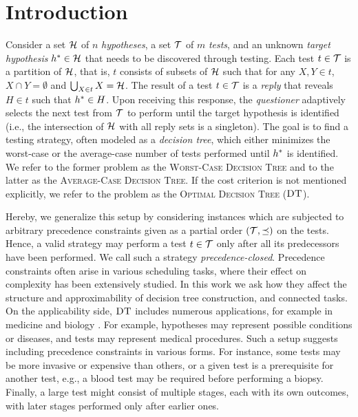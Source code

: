 \section{Introduction}

Consider a set $\mathcal{H}$ of $n$ \emph{hypotheses}, a set $\mathcal{T}$ of $m$ \emph{tests}, and an unknown \emph{target hypothesis} $h^*\in\mathcal{H}$ that needs to be discovered through testing.
Each test $t\in\mathcal{T}$ is a partition of $\mathcal{H}$, that is, $t$ consists of subsets of $\mathcal{H}$ such that for any $X,Y\in t$,  $X\cap Y=\emptyset$ and $\bigcup_{X\in t} X=\mathcal{H}$.
The result of a test $t\in\mathcal{T}$ is a \emph{reply} that reveals $H\in t$ such that $h^*\in H$. Upon receiving this response, the \emph{questioner} adaptively selects the next test from $\mathcal{T}$ to perform until the target hypothesis is identified (i.e., the intersection of $\mathcal{H}$ with all reply sets is a singleton). The goal is to find a testing strategy, often modeled as a \emph{decision tree}, which either minimizes the worst-case or the average-case number of tests performed until $h^*$ is identified. We refer to the former problem as the \textup{\textsc{Worst-Case Decision Tree}} and to the latter as the \textup{\textsc{Average-Case Decision Tree}}. If the cost criterion is not mentioned explicitly, we refer to the problem as the \textup{\textsc{Optimal Decision Tree}} ($\textup{\textsc{DT}}$).

Hereby, we generalize this setup by considering instances which are subjected to arbitrary precedence constraints given as a partial order $(\mathcal{T},\preceq)$ on the tests.
Hence, a valid strategy may perform a test $t\in\mathcal{T}$ only after all its predecessors have been performed. We call such a strategy \emph{precedence-closed}. Precedence constraints often arise in various scheduling tasks, where their effect on complexity has been extensively studied. In this work we ask how they affect the structure and approximability of decision tree construction, and connected tasks.
On the applicability side, $\textup{\textsc{DT}}$ includes numerous applications, for example in medicine and biology \cite{BayesianLearnerOptimalNoisyBinarySearch}.
For example, hypotheses may represent possible conditions or diseases, and tests may represent medical procedures. Such a setup suggests including precedence constraints in various forms. For instance, some tests may be more invasive or expensive than others, or a given test is a prerequisite for another test, e.g., a blood test may be required before performing a biopsy. Finally, a large test might consist of multiple stages, each with its own outcomes, with later stages performed only after earlier ones.

